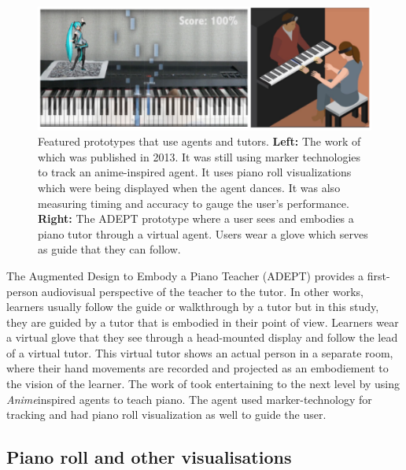 \documentclass[manuscript,screen]{acmart}
\begin{document}
\begin{figure}[t]
    \centering
    \includegraphics[width=15cm]{figures/goodwingerry.png}
    \caption{Featured prototypes that use agents and tutors. \textbf{Left:} The work of \cite{goodwin2013key} which was published in 2013. It was still using marker technologies to track an anime-inspired agent. It uses piano roll visualizations which were being displayed when the agent dances. It was also measuring timing and accuracy to gauge the user's performance.  \textbf{Right:} The ADEPT prototype \cite{gerry2019adept} where a user sees and embodies a piano tutor through a virtual agent. Users wear a glove which serves as guide that they can follow. }
    \label{fig:goodwingerry}
\end{figure}

The Augmented Design to Embody a Piano Teacher (ADEPT) \cite{gerry2019adept} provides a first-person audiovisual perspective of the teacher to the tutor. In other works, learners usually follow the guide or walkthrough by a tutor but in this study, they are guided by a tutor that is embodied in their point of view. Learners wear a virtual glove that they see through a head-mounted display and follow the lead of a virtual tutor. This virtual tutor shows an actual person in a separate room, where their hand movements are recorded and projected as an embodiement to the vision of the learner. The work of \cite{goodwin2013key} took entertaining to the next level by using \textit{Anime}\textendash inspired agents to teach piano. The agent used marker-technology for tracking and had piano roll visualization as well to guide the user. 

\subsection{Piano roll and other visualisations}
\label{subsec: viz}
\end{document}
